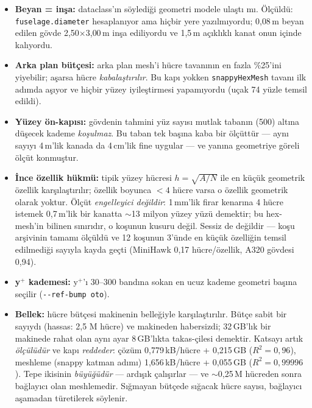 \documentclass[11pt,a4paper]{article}
\begin{document}
\begin{itemize}\setlength\itemsep{1pt}
  \item \textbf{Beyan = inşa:} dataclass'ın söylediği geometri modele ulaştı mı.
        Ölçüldü: \texttt{fuselage.diameter} hesaplanıyor ama hiçbir yere
        yazılmıyordu; 0{,}08\,m beyan edilen gövde 2{,}50$\times$3{,}00\,m
        inşa ediliyordu ve 1{,}5\,m açıklıklı kanat onun içinde kalıyordu.
  \item \textbf{Arka plan bütçesi:} arka plan mesh'i hücre tavanının en fazla
        \%25'ini yiyebilir; aşarsa hücre \emph{kabalaştırılır}. Bu kapı yokken
        \texttt{snappyHexMesh} tavanı ilk adımda aşıyor ve hiçbir yüzey
        iyileştirmesi yapamıyordu (uçak 74 yüzle temsil edildi).
  \item \textbf{Yüzey ön-kapısı:} gövdenin tahmini yüz sayısı mutlak tabanın
        (500) altına düşecek kademe \emph{koşulmaz}. Bu taban tek başına kaba
        bir ölçüttür --- aynı sayıyı 4\,m'lik kanada da 4\,cm'lik fine uygular
        --- ve yanına geometriye göreli ölçüt konmuştur.
  \item \textbf{İnce özellik hükmü:} tipik yüzey hücresi $h=\sqrt{A/N}$ ile en
        küçük geometrik özellik karşılaştırılır; özellik boyunca $<4$ hücre
        varsa o özellik geometrik olarak yoktur. Ölçüt \emph{engelleyici
        değildir}: 1\,mm'lik firar kenarına 4 hücre istemek 0{,}7\,m'lik bir
        kanatta $\sim$13 milyon yüzey yüzü demektir; bu hex-mesh'in bilinen
        sınırıdır, o koşunun kusuru değil. Sessiz de değildir --- koşu arşivinin
        tamamı ölçüldü ve 12 koşunun 3'ünde en küçük özelliğin temsil
        edilmediği sayıyla kayda geçti (MiniHawk 0{,}17 hücre/özellik, A320
        gövdesi 0{,}94).
  \item \textbf{y$^+$ kademesi:} y$^+$'ı 30--300 bandına sokan en ucuz kademe
        geometri başına seçilir (\texttt{-{}-ref-bump oto}).
  \item \textbf{Bellek:} hücre bütçesi makinenin belleğiyle karşılaştırılır.
        Bütçe sabit bir sayıydı (hassas: 2{,}5 M hücre) ve makineden habersizdi;
        32\,GB'lık bir makinede rahat olan aynı ayar 8\,GB'lıkta takas-çilesi
        demektir. Katsayı artık \emph{ölçülüdür} ve kapı \emph{reddeder}:
        çözüm 0{,}779\,kB/hücre + 0{,}215\,GB ($R^2{=}0{,}96$), meshleme
        (snappy katman adımı) 1{,}656\,kB/hücre + 0{,}055\,GB ($R^2{=}0{,}99996$).
        Tepe ikisinin \emph{büyüğüdür} --- ardışık çalışırlar --- ve $\sim$0{,}25\,M
        hücreden sonra bağlayıcı olan meshlemedir. Sığmayan bütçede sığacak
        hücre sayısı, bağlayıcı aşamadan türetilerek söylenir.
\end{itemize}
\end{document}
